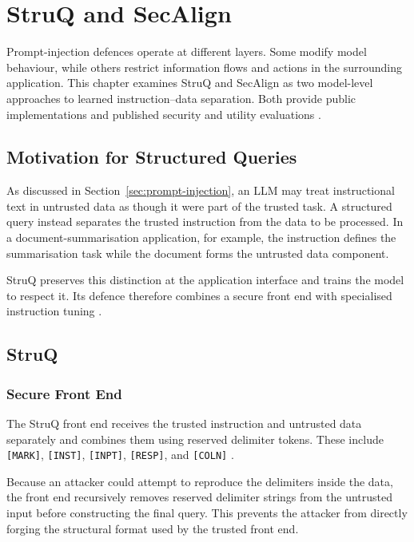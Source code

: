 \section{StruQ and SecAlign}
\label{sec:defences}
\label{sec:struq}

Prompt-injection defences operate at different layers. Some modify model
behaviour, while others restrict information flows and actions in the
surrounding application. This chapter examines StruQ and SecAlign as two
model-level approaches to learned instruction--data separation. Both provide
public implementations and published security and utility evaluations
\parencites{chen2025struq}{chen2025secalign}.

\subsection{Motivation for Structured Queries}
\label{subsec:structured-queries}

As discussed in Section~\ref{sec:prompt-injection}, an LLM may treat instructional text in
untrusted data as though it were part of the trusted task. A structured query
instead separates the trusted instruction from the data to be processed. In a
document-summarisation application, for example, the instruction defines the
summarisation task while the document forms the untrusted data component.

StruQ preserves this distinction at the application interface and trains the
model to respect it. Its defence therefore combines a secure front end with
specialised instruction tuning
\parencite{chen2025struq}.

\subsection{StruQ}
\label{subsec:struq}

\subsubsection{Secure Front End}
\label{subsubsec:struq-front-end}

The StruQ front end receives the trusted instruction and untrusted data
separately and combines them using reserved delimiter tokens. These include
\texttt{[MARK]}, \texttt{[INST]}, \texttt{[INPT]}, \texttt{[RESP]}, and
\texttt{[COLN]}
\parencite{chen2025struq}.

Because an attacker could attempt to reproduce the delimiters inside the data,
the front end recursively removes reserved delimiter strings from the untrusted 
input before constructing the final query.
This prevents the attacker from directly forging the structural format used by
the trusted front end.

